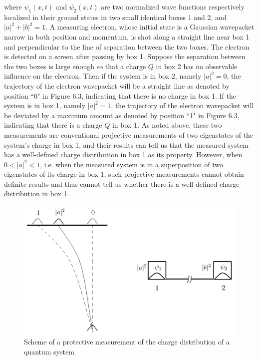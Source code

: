 \noindent where $\psi_1(x,t)$ and $\psi_2(x,t)$ are two normalized wave functions respectively localized in their ground states in two small identical boxes 1 and 2, and $|a|^2+|b|^2=1$. A measuring electron, whose initial state is a Gaussian wavepacket narrow in both position and momentum, is shot along a straight line near box 1 and perpendicular to the line of separation between the two boxes. The electron is detected on a screen after passing by box 1. Suppose the separation between the two boxes is large enough so that a  charge $Q$ in box 2 has no observable influence on the electron. Then if the system is in box 2, namely $|a|^2=0$, the trajectory of the electron wavepacket will be a straight line as denoted by position ``0" in Figure 6.3, indicating that there is no charge in box 1. If  the system is in box 1, namely $|a|^2=1$, the trajectory of the electron wavepacket will be deviated by a maximum amount as denoted by position ``1" in Figure 6.3, indicating that there is a charge $Q$ in box 1. As noted above, these two measurements are conventional projective measurements of two eigenstates of the system's charge in box 1, and their results can tell us that the measured system has a well-defined charge distribution in box 1 as its property. However, when $0< |a|^2 <1$, i.e. when the measured system is in a superposition of two eigenstates of its charge in box 1, such projective measurements cannot obtain definite results and thus cannot tell us whether there is a well-defined charge distribution in box 1.

\begin{center} 
\begin{figure}[h]\label{ptmc}

\includegraphics[scale=0.39]{fig63.jpg}

\caption{Scheme of a protective measurement of the charge distribution of a quantum system}

\end{figure} 
\end{center} 

